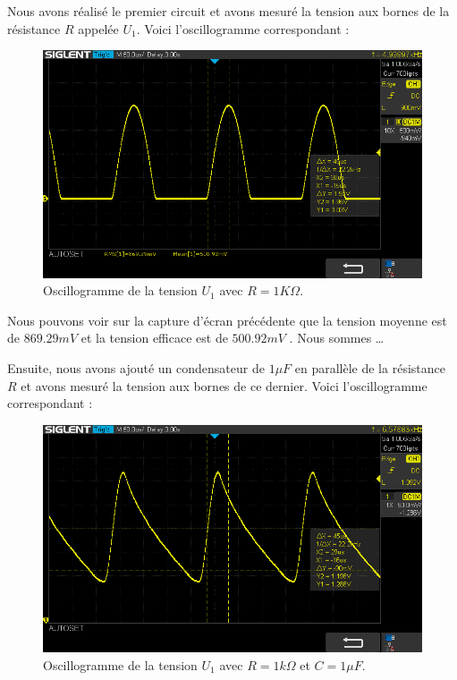 Nous avons réalisé le premier circuit et avons mesuré la tension aux bornes de la résistance $R$ appelée $U_1$. Voici l'oscillogramme correspondant :

\begin{figure}[H]
    \begin{center}
    \includegraphics[scale=0.5]{images/Oscillo/SDS00006.png}
    \caption{Oscillogramme de la tension $U_1$ avec $R=1K\Omega$.}
    \end{center}
\end{figure}

Nous pouvons voir sur la capture d'écran précédente que la tension moyenne est de $869.29mV$ et la tension efficace est de $500.92mV$ . Nous sommes \dots

Ensuite, nous avons ajouté un condensateur de $1\mu F$ en parallèle de la résistance $R$ et avons mesuré la tension aux bornes de ce dernier. Voici l'oscillogramme correspondant :

\begin{figure}[H]
    \begin{center}
    \includegraphics[scale=0.5]{images/Oscillo/SDS00003.png}
    \caption{Oscillogramme de la tension $U_1$ avec $R=1k\Omega$ et $C=1\mu F$.}
    \end{center}
\end{figure}

